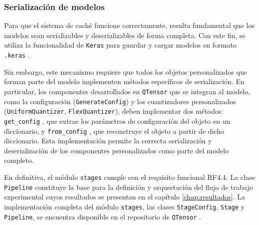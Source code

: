 \subsubsection{Serialización de modelos}

Para que el sistema de caché funcione correctamente, resulta fundamental que los modelos sean serializables y deserializables de forma completa. Con este fin, se utiliza la funcionalidad de \texttt{Keras} para guardar y cargar modelos en formato \texttt{.keras} \cite{tensorflow_serialization_guide}.

Sin embargo, este mecanismo requiere que todos los objetos personalizados que forman parte del modelo implementen métodos específicos de serialización. En particular, los componentes desarrollados en \texttt{QTensor} que se integran al modelo, como la configuración (\texttt{GenerateConfig}) y los cuantizadores personalizados (\texttt{UniformQuantizer}, \texttt{FlexQuantizer}), deben implementar dos métodos: \texttt{get\_config} \cite{tensorflow_serialization_guide}, que extrae los parámetros de configuración del objeto en un diccionario, y \texttt{from\_config} \cite{tensorflow_serialization_guide}, que reconstruye el objeto a partir de dicho diccionario. Esta implementación permite la correcta serialización y deserialización de los componentes personalizados como parte del modelo completo.

En definitiva, el módulo \texttt{stages} cumple con el requisito funcional RF4.4. La clase \texttt{Pipeline} constituye la base para la definición y orquestación del flujo de trabajo experimental cuyos resultados se presentan en el capítulo \ref{chap:resultados}. La implementación completa del módulo \texttt{stages}, las clases \texttt{StageConfig}, \texttt{Stage} y \texttt{Pipeline}, se encuentra disponible en el repositorio de \texttt{QTensor} \cite{qtensor_stage}.
